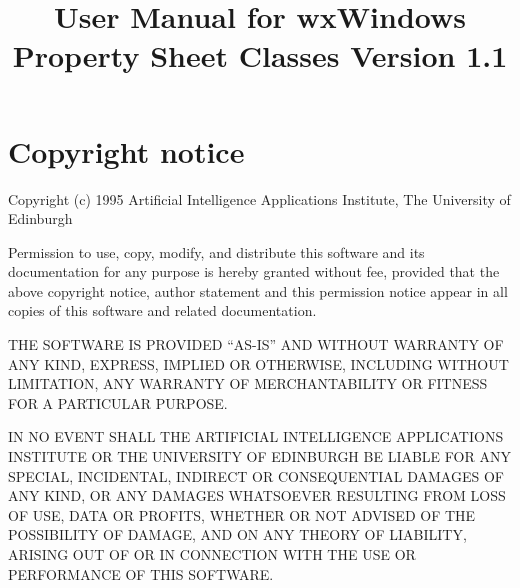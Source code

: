 
\parskip=10pt
\parindent=0pt
\title{User Manual for wxWindows Property Sheet Classes Version 1.1}
\makeindex

\maketitle
\pagestyle{fancyplain}

\setfooter{\thepage}{}{}{}{}{\thepage}%
\tableofcontents

\chapter*{Copyright notice}
%
\setfooter{\thepage}{}{}{}{}{\thepage}%

\begin{center}
Copyright (c) 1995 Artificial Intelligence Applications Institute,
The University of Edinburgh\\
\end{center}

Permission to use, copy, modify, and distribute this software and its
documentation for any purpose is hereby granted without fee, provided that the
above copyright notice, author statement and this permission notice appear in
all copies of this software and related documentation.

THE SOFTWARE IS PROVIDED ``AS-IS'' AND WITHOUT WARRANTY OF ANY KIND, EXPRESS,
IMPLIED OR OTHERWISE, INCLUDING WITHOUT LIMITATION, ANY WARRANTY OF
MERCHANTABILITY OR FITNESS FOR A PARTICULAR PURPOSE.

IN NO EVENT SHALL THE ARTIFICIAL INTELLIGENCE APPLICATIONS INSTITUTE OR THE
UNIVERSITY OF EDINBURGH BE LIABLE FOR ANY SPECIAL, INCIDENTAL, INDIRECT OR
CONSEQUENTIAL DAMAGES OF ANY KIND, OR ANY DAMAGES WHATSOEVER RESULTING FROM
LOSS OF USE, DATA OR PROFITS, WHETHER OR NOT ADVISED OF THE POSSIBILITY OF
DAMAGE, AND ON ANY THEORY OF LIABILITY, ARISING OUT OF OR IN CONNECTION WITH
THE USE OR PERFORMANCE OF THIS SOFTWARE.





\newpage

%
\setfooter{\thepage}{}{}{}{}{\thepage}
\printindex


